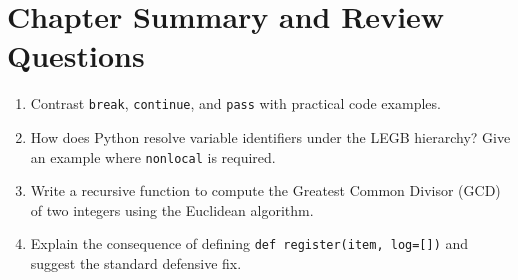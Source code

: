 \section{Chapter Summary and Review Questions}
\begin{enumerate}[leftmargin=1.8em, itemsep=4pt]
    \item Contrast \texttt{break}, \texttt{continue}, and \texttt{pass} with practical code examples.
    \item How does Python resolve variable identifiers under the LEGB hierarchy? Give an example where \texttt{nonlocal} is required.
    \item Write a recursive function to compute the Greatest Common Divisor (GCD) of two integers using the Euclidean algorithm.
    \item Explain the consequence of defining \texttt{def register(item, log=[])} and suggest the standard defensive fix.
\end{enumerate}
